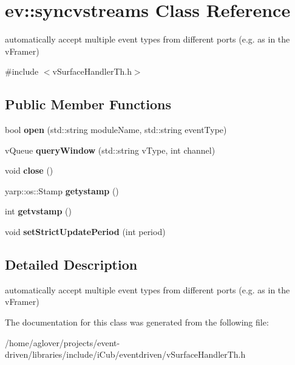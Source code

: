 \hypertarget{classev_1_1syncvstreams}{}\section{ev\+:\+:syncvstreams Class Reference}
\label{classev_1_1syncvstreams}


automatically accept multiple event types from different ports (e.\+g. as in the v\+Framer)  




{\ttfamily \#include $<$v\+Surface\+Handler\+Th.\+h$>$}

\subsection*{Public Member Functions}
\begin{DoxyCompactItemize}
\item 
bool {\bfseries open} (std\+::string module\+Name, std\+::string event\+Type)\hypertarget{classev_1_1syncvstreams_acc652540f64e92a0528e25932ff51d8f}{}\label{classev_1_1syncvstreams_acc652540f64e92a0528e25932ff51d8f}

\item 
v\+Queue {\bfseries query\+Window} (std\+::string v\+Type, int channel)\hypertarget{classev_1_1syncvstreams_a347bea90f23cf334667bb3e4b7bcf7a0}{}\label{classev_1_1syncvstreams_a347bea90f23cf334667bb3e4b7bcf7a0}

\item 
void {\bfseries close} ()\hypertarget{classev_1_1syncvstreams_ae4bdb73e97024c7399d8a105bdc8425a}{}\label{classev_1_1syncvstreams_ae4bdb73e97024c7399d8a105bdc8425a}

\item 
yarp\+::os\+::\+Stamp {\bfseries getystamp} ()\hypertarget{classev_1_1syncvstreams_a61e65f054ee803198d3e642df2bc1024}{}\label{classev_1_1syncvstreams_a61e65f054ee803198d3e642df2bc1024}

\item 
int {\bfseries getvstamp} ()\hypertarget{classev_1_1syncvstreams_a8846f86bb2794a7b6117c4f9d9c9fa65}{}\label{classev_1_1syncvstreams_a8846f86bb2794a7b6117c4f9d9c9fa65}

\item 
void {\bfseries set\+Strict\+Update\+Period} (int period)\hypertarget{classev_1_1syncvstreams_a83d0eb380a6a8eda16f35b45a7773da6}{}\label{classev_1_1syncvstreams_a83d0eb380a6a8eda16f35b45a7773da6}

\end{DoxyCompactItemize}


\subsection{Detailed Description}
automatically accept multiple event types from different ports (e.\+g. as in the v\+Framer) 

The documentation for this class was generated from the following file\+:\begin{DoxyCompactItemize}
\item 
/home/aglover/projects/event-\/driven/libraries/include/i\+Cub/eventdriven/v\+Surface\+Handler\+Th.\+h\end{DoxyCompactItemize}
